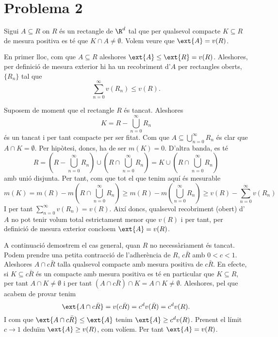 \documentclass[12pt]{article}
\begin{document}
\section*{Problema 2}
Sigui \( A \subseteq R \) on \( R \) és un rectangle de \( \R^d \) tal que per qualsevol
compacte \( K \subseteq R \) de mesura positiva es té que \( K \cap A \neq \emptyset \).
Volem veure que \( \ext{A} = v(R) \). 

En primer lloc, com que \( A \subseteq R \) aleshores \( \ext{A} \leq \ext{R} = v(R) \).
Aleshores, per definició de mesura exterior hi ha un recobriment d'\( A \) per rectangles
oberts, \( \{ R_n \} \) tal que 
\begin{equation*}
	\sum_{n = 0}^{\infty} v(R_n) \leq v(R). 
\end{equation*}

Suposem de moment que el rectangle \( R \) és tancat. Aleshores
\begin{equation*}
	K = R - \bigcup_{n = 0}^{\infty} R_n
\end{equation*}
és un tancat i per tant compacte per ser fitat. Com que \( A \subseteq \bigcup_{n =
0}^\infty R_n \) és clar que \( A \cap K = \emptyset \). Per hipòtesi, doncs, ha de ser \(
m(K) = 0\). D'altra banda, es té
\begin{equation*}
	R = \left(R - \bigcup_{n = 0}^\infty R_n\right) \cup \left(R \cap \bigcup_{n = 0}^\infty R_n\right) = K \cup \left(R \cap \bigcup_{n = 0}^\infty R_n\right) 
\end{equation*}
amb unió disjunta. Per tant, com que tot el que tenim aquí és mesurable
\begin{equation*}
	m(K) = m(R) - m\left(R \cap \bigcup_{n = 0}^\infty R_n\right) \geq m(R) -
	m\left(\bigcup_{n = 0}^\infty R_n\right) \geq v(R) - \sum_{n = 0}^{\infty} v(R_n)
\end{equation*}
I per tant \( \sum_{n = 0}^{\infty}v(R_n) = v(R)  \). Així doncs, qualsevol recobriment
(obert) d'\( A \) no pot tenir volum total estrictament menor que \( v(R) \) i per tant,
per definició de mesura exterior concloem \( \ext{A} = v(R) \).

A continuació demostrem el cas general, quan \( R \) no necessàriament és tancat. Podem
prendre una petita contracció de l'adherència de \( R \), \( c\bar{R} \) amb \( 0 < c < 1
\). Aleshores \( A \cap c\bar{R} \) talla qualsevol compacte amb mesura positiva de \(
c\bar{R} \). En efecte, si \( K \subseteq c\bar{R} \) és un compacte amb mesura positiva
es té en particular que \( K \subseteq R \), per tant \( A \cap K \neq \emptyset \) i per
tant \( (A \cap c \bar{R}) \cap K = A \cap K \neq \emptyset \). Aleshores, pel que acabem
de provar tenim
\begin{equation*}
	\ext{A \cap c\bar{R}} = v(c \bar{R}) = c^d v(\bar{R}) = c^d v(R).
\end{equation*}
I com que \( \ext{A \cap c \bar{R}} \leq \ext{A} \) tenim \( \ext{A} \geq c^d v(R) \).
Prenent el límit \( c \to 1 \) deduïm \( \ext{A} \geq v(R) \), com volíem. Per tant \(
\ext{A} = v(R) \).
\end{document}

